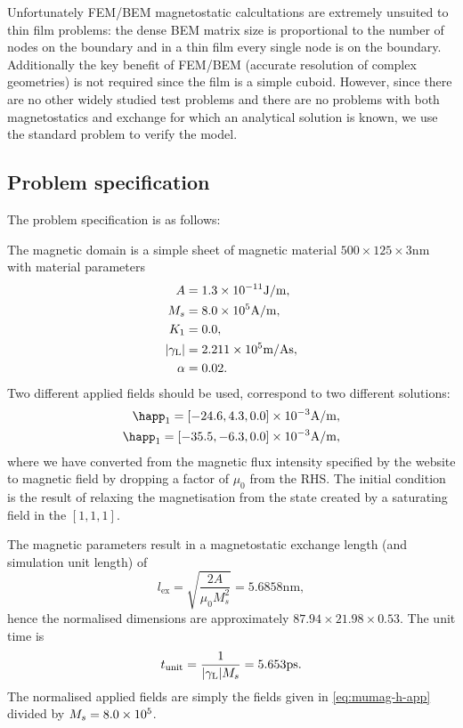 Unfortunately FEM/BEM magnetostatic calcultations are extremely unsuited to thin film problems: the dense BEM matrix size is proportional to the number of nodes on the boundary and in a thin film every single node is on the boundary.
Additionally the key benefit of FEM/BEM (accurate resolution of complex geometries) is not required since the film is a simple cuboid.
However, since there are no other widely studied test problems and there are no problems with both magnetostatics and exchange for which an analytical solution is known, we use the standard problem to verify the model.


\subsection{Problem specification}

The problem specification is as follows:

The magnetic domain is a simple sheet of magnetic material $500 \times 125 \times 3$nm with material parameters
\begin{equation}
  \begin{aligned}
    A &= 1.3\times 10^{-11} \text{J/m}, \\
    M_s &= 8.0\times 10^{5} \text{A/m}, \\
    K_1 &= 0.0, \\
    {\left|{\gamma_{\mathrm{\tiny{L}}}} \right|} &= 2.211 \times 10^{5} \text{m/As}, \\
    \alpha &= 0.02.
  \end{aligned}
\end{equation}
Two different applied fields should be used, correspond to two different solutions:
\begin{equation}
  \begin{aligned}
    \happ_1 = [-24.6, 4.3, 0.0] \E{-3}\text{A/m}, \\
    \happ_1 = [-35.5, -6.3, 0.0] \E{-3}\text{A/m}, \\
  \end{aligned}
  \label{eq:mumag-h-app}
\end{equation}
where we have converted from the magnetic flux intensity specified by the \mumag website to magnetic field by dropping a factor of $\mu_0$ from the RHS.
The initial condition is the result of relaxing the magnetisation from the state created by a saturating field in the $[1,1,1]$.

The magnetic parameters result in a magnetostatic exchange length (and simulation unit length) of
\begin{equation}
  l_{\text{ex}} = \sqrt{\frac{2A}{\mu_0 M_s^2}} = 5.6858\text{nm},
\end{equation}
hence the normalised dimensions are approximately $87.94 \times 21.98 \times 0.53$.
The unit time is
\begin{equation}
  t_{\text{unit}} = \frac{1}{{\left|{\gamma_{\mathrm{\tiny{L}}}} \right|} M_s} = 5.653\text{ps}.
\end{equation}
The normalised applied fields are simply the fields given in \cref{eq:mumag-h-app} divided by $M_s = 8.0\times 10^{5}$.

